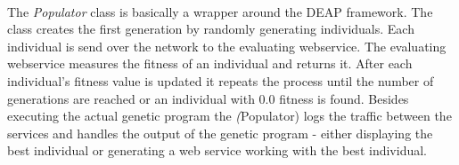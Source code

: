\paragraph{}
The \textit{Populator} class is basically a wrapper around the DEAP framework. The class creates the first generation by
randomly generating individuals. Each individual is send over the network to the evaluating webservice. The evaluating webservice measures the fitness
of an individual and returns it. After each individual's fitness value is updated it
repeats the process until the number of generations are reached or an individual with 0.0 fitness is found. Besides executing the actual genetic program the \textit(Populator)
logs the traffic between the services and handles the output of the genetic program - either displaying the best individual or 
generating a web service working with the best individual.

